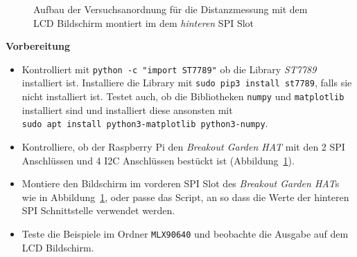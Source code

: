 \documentclass[
  11pt,
  a4paper,
  oneside, openany  ,captions=tableheading
]{scrbook}
\providecommand{\tightlist}{%
  \setlength{\itemsep}{0pt}\setlength{\parskip}{0pt}}
\theoremstyle{remark}
\begin{document}
\begin{figure}


\caption{\label{fig-mlx90640-LCD}Aufbau der Versuchsanordnung für die
Distanzmessung mit dem LCD Bildschirm montiert im dem \emph{hinteren}
SPI Slot}

\end{figure}%

\textbf{Vorbereitung}

\begin{itemize}
\tightlist
\item
  Kontrolliert mit \texttt{python\ -c\ "import\ ST7789"} ob die Library
  \emph{ST7789} installiert ist. Installiere die Library mit
  \texttt{sudo\ pip3\ install\ st7789}, falls sie nicht installiert ist.
  Testet auch, ob die Bibliotheken \texttt{numpy} und
  \texttt{matplotlib} installiert sind und installiert diese ansonsten
  mit \texttt{sudo\ apt\ install\ python3-matplotlib\ python3-numpy}.
\item
  Kontrolliere, ob der Raspberry Pi den \emph{Breakout Garden HAT} mit
  den 2 SPI Anschlüssen und 4 I2C Anschlüssen bestückt ist
  (Abbildung~\ref{fig-mlx90640-LCD}).
\item
  Montiere den Bildschirm im vorderen SPI Slot des \emph{Breakout Garden
  HAT}s wie in Abbildung~\ref{fig-mlx90640-LCD}, oder passe das Script,
  an so dass die Werte der hinteren SPI Schnittstelle verwendet werden.
\item
  Teste die Beispiele im Ordner \texttt{MLX90640} und beobachte die
  Ausgabe auf dem LCD Bildschirm.
\end{itemize}
\end{document}
